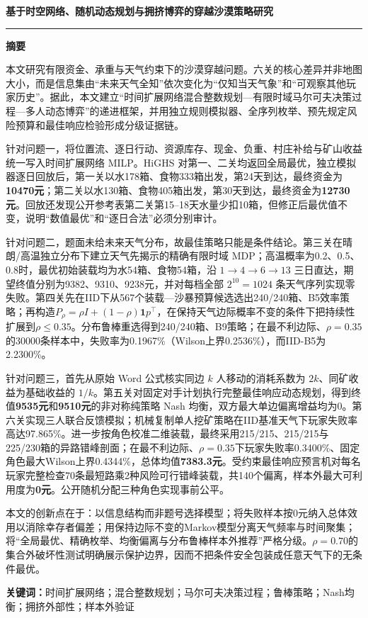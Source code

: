 \thispagestyle{plain}
\begin{center}
{\sffamily\bfseries\color{DesertNavy} 基于时空网络、随机动态规划与拥挤博弈的穿越沙漠策略研究\par}
\vspace{0.6em}
{\color{DesertNavy}\rule{0.38\textwidth}{1.2pt}}\par
\vspace{1.2em}
{\sffamily\bfseries 摘\quad 要}
\end{center}

\begingroup
\small
本文研究有限资金、承重与天气约束下的沙漠穿越问题。六关的核心差异并非地图大小，而是信息集由“未来天气全知”依次变化为“仅知当天气象”和“可观察其他玩家历史”。据此，本文建立“时间扩展网络混合整数规划—有限时域马尔可夫决策过程—多人动态博弈”的递进框架，并用独立规则模拟器、全序列枚举、预先规定风险预算和最佳响应检验形成分级证据链。

针对问题一，将位置流、逐日行动、资源库存、现金、负重、村庄补给与矿山收益统一写入时间扩展网络 MILP。HiGHS 对第一、二关均返回全局最优，独立模拟器逐日回放后，第一关以水178箱、食物333箱出发，第24天到达，最终资金为\textbf{10470元}；第二关以水130箱、食物405箱出发，第30天到达，最终资金为\textbf{12730元}。回放还发现公开参考表第二关第15--18天水量少扣10箱，但修正后最优值不变，说明“数值最优”和“逐日合法”必须分别审计。

针对问题二，题面未给未来天气分布，故最佳策略只能是条件结论。第三关在晴朗/高温独立分布下建立天气先揭示的精确有限时域 MDP；高温概率为0.2、0.5、0.8时，最优初始装载均为水54箱、食物54箱，沿 $1\to4\to6\to13$ 三日直达，期望终值分别为9382、9310、9238元，并对每档全部 $2^{10}=1024$ 条天气序列实现零失败。第四关先在IID下从567个装载—沙暴预算候选选出240/240箱、B5效率策略；再构造$P_\rho=\rho I+(1-\rho)\bm 1p^\top$，在保持天气边际概率不变的条件下把持续性扩展到$\rho\le0.35$。分布鲁棒重选得到240/240箱、B9策略；在最不利边际、$\rho=0.35$的30000条样本中，失败率为0.1967\%（Wilson上界0.2536\%），而IID-B5为2.2300\%。

针对问题三，首先从原始 Word 公式核实同边 $k$ 人移动的消耗系数为 $2k$、同矿收益为基础收益的 $1/k$。第五关对固定对手计划执行完整最佳响应动态规划，得到终值\textbf{9535元}和\textbf{9510元}的非对称纯策略 Nash 均衡，双方最大单边偏离增益均为0。第六关实现三人联合反馈模拟；机械复制单人挖矿策略在IID基准天气下玩家失败率高达97.865\%。进一步按角色校准二维装载，最终采用215/215、215/215与225/230箱的异路错峰剖面；在最不利边际、$\rho=0.35$下玩家失败率0.3400\%、固定角色最大Wilson上界0.4344\%，总体均值\textbf{7383.3元}。受约束最佳响应预言机对每名玩家完整检查70条最短路乘2种风险可行错峰装载，共140个偏离，样本外最大可利用度为\textbf{0元}。公开随机分配三种角色实现事前公平。

本文的创新点在于：以信息结构而非题号选择模型；将失败样本按0元纳入总体效用以消除幸存者偏差；用保持边际不变的Markov模型分离天气频率与时间聚集；将“全局最优、精确枚举、均衡偏离与分布鲁棒样本外推荐”严格分级。$\rho=0.70$的集合外破坏性测试明确展示保护边界，因而不把条件安全包装成任意天气下的无条件最优。

\vspace{0.8em}
\noindent\textbf{关键词：}时间扩展网络；混合整数规划；马尔可夫决策过程；鲁棒策略；Nash均衡；拥挤外部性；样本外验证
\endgroup
